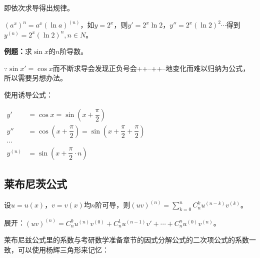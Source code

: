 \documentclass[UTF8, 12pt]{ctexart}
\begin{document}
即依次求导得出规律。

$(a^x)^n=a^x(\ln a)^{(n)}$，如$y=2^x$，则$y'=2^x\ln 2$，$y''=2^x(\ln 2)^2\cdots$得到$y^{(n)}=2^x(\ln 2)^n,n\in N$。

\textbf{例题：}求$\sin x$的$n$阶导数。

$\because \sin x'=\cos x$而不断求导会发现正负号会++--++--地变化而难以归纳为公式，所以需要另想办法。

使用诱导公式：

$
\begin{aligned}
    y'& =\cos x=\sin(x+\dfrac{\pi}{2}) \\
    y''& =\cos(x+\dfrac{\pi}{2})=\sin(x+\dfrac{\pi}{2}+\dfrac{\pi}{2}) \\
    \cdots & \\
    y^{(n)}& =\sin(x+\dfrac{\pi}{2}\cdot n)
\end{aligned}
$

\subsection{莱布尼茨公式}

设$u=u(x)$，$v=v(x)$均$n$阶可导，则$(uv)^{(n)}=\sum_{k=0}^nC_n^ku^{(n-k)}v^{(k)}$。

展开：$(uv)^{(n)}=C_n^0u^{(n)}v^{(0)}+C_n^1u^{(n-1)}v'+\cdots+C_n^nu^{(0)}v^{(n)}$。

莱布尼兹公式里的系数与考研数学准备章节的因式分解公式的二次项公式的系数一致，可以使用杨辉三角形来记忆：
\end{document}
